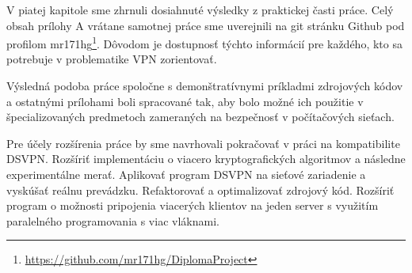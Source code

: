 V piatej kapitole sme zhrnuli dosiahnuté výsledky z praktickej časti práce. Celý obsah prílohy A vrátane samotnej práce sme uverejnili na git stránku Github pod profilom mr171hg\footnote{\url{https://github.com/mr171hg/DiplomaProject}}. Dôvodom je dostupnosť týchto informácií pre každého, kto sa potrebuje v problematike VPN zorientovať.  

Výsledná podoba práce spoločne s demonštratívnymi príkladmi zdrojových kódov a ostatnými prílohami boli spracované tak, aby bolo možné ich použitie v špecializovaných predmetoch zameraných na bezpečnosť v počítačových sieťach.

Pre účely rozšírenia práce by sme navrhovali pokračovať v práci na kompatibilite DSVPN. Rozšíriť implementáciu o viacero kryptografických algoritmov a následne experimentálne merať. Aplikovať program DSVPN na sieťové zariadenie a vyskúšať reálnu prevádzku. Refaktorovať a optimalizovať zdrojový kód. Rozšíriť program o možnosti pripojenia viacerých klientov na jeden server s využitím paralelného programovania s viac vláknami. 
